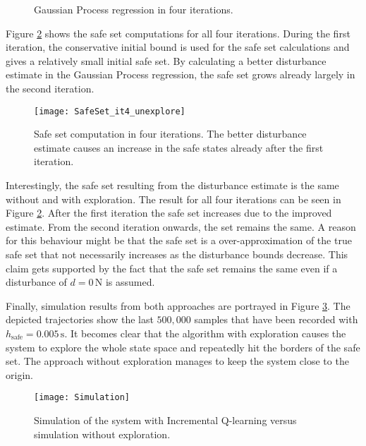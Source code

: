 \documentclass[../main.tex]{subfiles}
\begin{document}
\begin{figure}[H]
    \centering
        \caption{Gaussian Process regression in four iterations.}  \label{fig:GP_it4_doubleexplore}
\end{figure}


Figure \ref{fig:SafeSet_it4_unexplore} shows the safe set computations for all four iterations. During the first iteration, the conservative initial bound is used for the safe set calculations and gives a relatively small initial safe set. By calculating a better disturbance estimate in the Gaussian Process regression, the safe set grows already largely in the second iteration. 
\begin{figure}[h]
    \centering
    \texttt{[image: SafeSet\_it4\_unexplore]}
        \caption{Safe set computation in four iterations. The better disturbance estimate causes an increase in the safe states already after the first iteration.}  \label{fig:SafeSet_it4_unexplore}
\end{figure}

Interestingly, the safe set resulting from the disturbance estimate is the same without and with exploration. The result for all four iterations can be seen in Figure \ref{fig:SafeSet_it4_unexplore}. After the first iteration the safe set increases due to the improved estimate. From the second iteration onwards, the set remains the same. A reason for this behaviour might be that the safe set is a over-approximation of the true safe set that not necessarily increases as the disturbance bounds decrease. This claim gets supported by the fact that the safe set remains the same even if a disturbance of $d = 0\,\text{N}$ is assumed.\par

Finally, simulation results from both approaches are portrayed in Figure \ref{fig:Simulation}. The depicted trajectories show the last $500,000$ samples that have been recorded with $h_\text{safe} = 0.005\,\text{s}$. It becomes clear that the algorithm with exploration causes the system to explore the whole state space and repeatedly hit the borders of the safe set. The approach without exploration manages to keep the system close to the origin. 

\begin{figure}
    \centering
    \texttt{[image: Simulation]}
        \caption{Simulation of the system with Incremental Q-learning versus simulation without exploration.}\label{fig:Simulation}
\end{figure}
\end{document}
